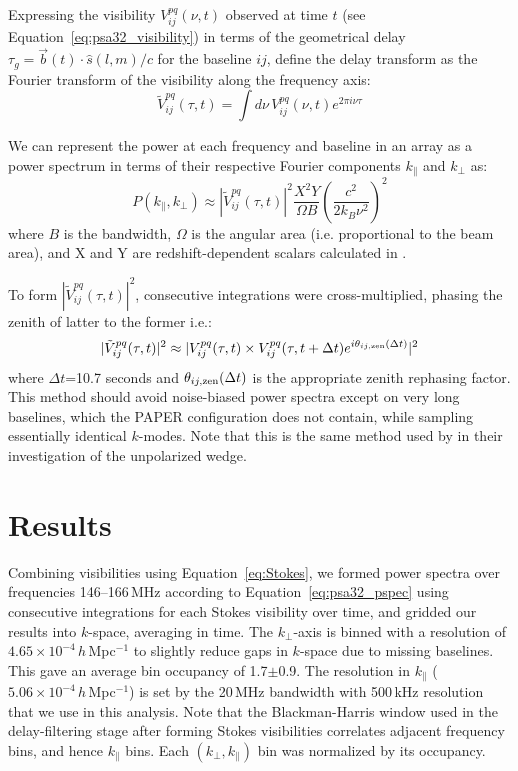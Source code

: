 Expressing the visibility $V_{ij}^{pq}(\nu,t)$ observed at time $t$ (see Equation~\ref{eq:psa32_visibility}) in terms of the geometrical delay $\tau_g=\vec{b}(t) \cdot \hat{s}(l,m)/c$ for the baseline $ij$, \citet{Parsons.12a} define the delay transform as the Fourier transform of the visibility along the frequency axis:
\begin{equation}
\tilde{V}_{ij}^{pq}(\tau,t) = \int d\nu \, V_{ij}^{pq}(\nu,t) e^{2\pi i \nu \tau}
\end{equation}

We can represent the power at each frequency and baseline in an array as a power spectrum in terms of their respective Fourier components $k_{\parallel}$ and $k_{\perp}$ as:
\begin{equation}
P(k_{\parallel},k_{\perp}) \approx |\tilde{V}_{ij}^{pq}(\tau,t)|^2 \frac{X^2Y}{\Omega B}\left(\frac{c^2}{2k_B\nu^2}\right)^2
\label{eq:psa32_pspec}
\end{equation}
where $B$ is the bandwidth, $\Omega$ is the angular area (i.e. proportional to the beam area), and X and Y are redshift-dependent scalars calculated in \citet{Parsons.12b}. 

To form $|\tilde{V}_{ij}^{pq}(\tau,t)|^2$, consecutive integrations were cross-multiplied, phasing the zenith of latter to the former i.e.:
\begin{equation}
|\tilde{V}_{ij}^{pq}(\tau,t)|^2 \approx |{V}_{ij}^{pq}(\tau,t)\times {V}_{ij}^{pq}(\tau,t+\Delta t)e^{i\theta_{ij,{\rm zen}}(\Delta t)}|^2
\end{equation}
where $\Delta t$=10.7 seconds and $\theta_{ij,{\rm zen}}(\Delta t)$ is the appropriate zenith rephasing factor. This method should avoid noise-biased power spectra except on very long baselines, which the PAPER configuration does not contain, while sampling essentially identical $k$-modes.  Note that this is the same method used by \citet{Pober.13} in their investigation of the unpolarized wedge.

\section{Results}
\label{sec:psa32_res}
Combining visibilities using Equation~\ref{eq:Stokes}, we formed power spectra over frequencies 146--166\,MHz according to Equation~\ref{eq:psa32_pspec} using consecutive integrations for each Stokes visibility over time, and gridded our results into $k$-space, averaging in time. 
The $k_{\perp}$-axis is binned with a resolution of $4.65\times10^{-4}\,h$\,Mpc$^{-1}$ to slightly reduce gaps in $k$-space due to missing baselines. This gave an average bin occupancy of 1.7$\pm$0.9.
The resolution in $k_{\parallel}$ ($5.06\times10^{-4}\,h$\,Mpc$^{-1}$) is set by the 20\,MHz bandwidth with 500\,kHz resolution that we use in this analysis.
Note that the Blackman-Harris window used in the delay-filtering stage after forming Stokes visibilities correlates adjacent frequency bins, and hence $k_{\parallel}$ bins.
Each $(k_{\perp},k_{\parallel})$ bin was normalized by its occupancy.

